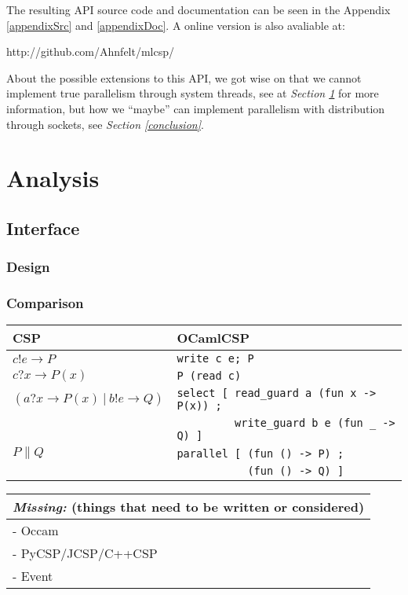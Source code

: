 \documentclass[a4paper,12pt]{article}
\newcommand{\missing}[1]{
\begin{tabular}{|p{11cm}|}
\hline
\emph{Missing:} {\scriptsize (things that need to be written or considered)} \\
\hline
#1
\hline
\end{tabular}
}
\begin{document}
The resulting API source code and documentation can be seen in the Appendix
\ref{appendixSrc} and \ref{appendixDoc}. A online version is also avaliable at:

\begin{center}
http://github.com/Ahnfelt/mlcsp/
\end{center}

About the possible extensions to this API, we got wise on that we cannot
implement true parallelism through system threads, see at {\it Section
\ref{analysis}} for more information, but how we ``maybe'' can implement
parallelism with distribution through sockets, see {\it Section 
\ref{conclusion}}.

\section{Analysis}
\label{analysis}

\subsection{Interface}

\subsubsection{Design}

\subsubsection{Comparison}

\begin{tabular}{l|l}
CSP & OCamlCSP \\
\hline
$c!e \to P$ & \texttt{write c e; P} \\
\hline
$c?x \to P(x)$ & \texttt{P (read c)} \\
\hline
$(a?x \to P(x)\ |\ b!e \to Q)$ 
&\verb|select [ read_guard a (fun x -> P(x)) ;| \\
&\verb|         write_guard b e (fun _ -> Q) ]|\\
\hline
$P \parallel Q$ 
&\verb|parallel [ (fun () -> P) ;| \\
&\verb|           (fun () -> Q) ]| \\
\end{tabular}

\missing{
- Occam \\
- PyCSP/JCSP/C++CSP \\
- Event \\
}
\end{document}
